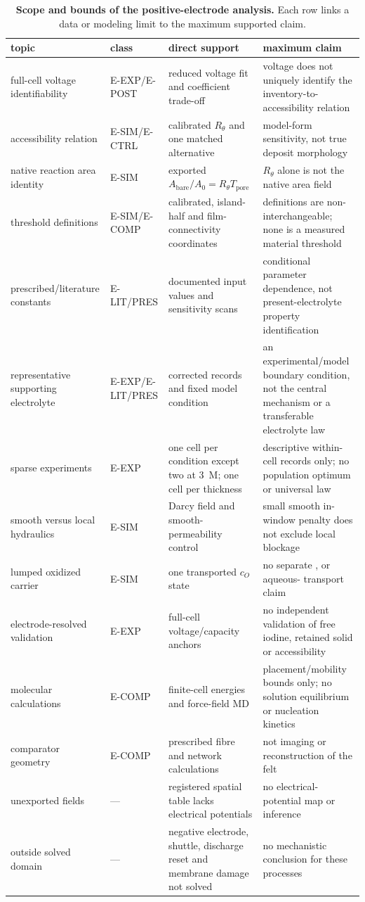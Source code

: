 \documentclass[11pt]{article}
\newcommand{\Rtheta}{R_{\theta}}
\newcommand{\Tpore}{T_{\mathrm{pore}}}
\begin{document}
\begin{table}[!htbp]
\centering\scriptsize
\caption{\textbf{Scope and bounds of the positive-electrode analysis.} Each row links a data or modeling limit
to the maximum supported claim.}
\label{tab:bounds}
\begin{tabularx}{\textwidth}{@{}P{2.7cm}P{2.0cm}YP{3.4cm}@{}}
\toprule
topic & class & direct support & maximum claim\\
\midrule
full-cell voltage identifiability & E-EXP/E-POST & reduced voltage fit and coefficient trade-off & voltage does not uniquely identify the inventory-to-accessibility relation\\
accessibility relation & E-SIM/E-CTRL & calibrated $\Rtheta$ and one matched alternative & model-form sensitivity, not true deposit morphology\\
native reaction area identity & E-SIM & exported $A_{\mathrm{bare}}/A_0=\Rtheta\Tpore$ & $\Rtheta$ alone is not the native area field\\
threshold definitions & E-SIM/E-COMP & calibrated, island-half and film-connectivity coordinates & definitions are non-interchangeable; none is a measured material threshold\\
prescribed/literature constants & E-LIT/PRES & documented input values and sensitivity scans & conditional parameter dependence, not present-electrolyte property identification\\
representative supporting electrolyte & E-EXP/E-LIT/PRES & corrected records and fixed model condition & an experimental/model boundary condition, not the central mechanism or a transferable electrolyte law\\
sparse experiments & E-EXP & one cell per condition except two at 3~M; one cell per thickness & descriptive within-cell records only; no population optimum or universal law\\
smooth versus local hydraulics & E-SIM & Darcy field and smooth-permeability control & small smooth in-window penalty does not exclude local blockage\\
lumped oxidized carrier & E-SIM & one transported $c_O$ state & no separate ,  or aqueous- transport claim\\
electrode-resolved validation & E-EXP & full-cell voltage/capacity anchors & no independent validation of free iodine, retained solid or accessibility\\
molecular calculations & E-COMP & finite-cell energies and force-field MD & placement/mobility bounds only; no solution equilibrium or nucleation kinetics\\
comparator geometry & E-COMP & prescribed fibre and network calculations & not imaging or reconstruction of the felt\\
unexported fields & --- & registered spatial table lacks electrical potentials & no electrical-potential map or inference\\
outside solved domain & --- & negative electrode, shuttle, discharge reset and membrane damage not solved & no mechanistic conclusion for these processes\\
\bottomrule
\end{tabularx}
\end{table}
\end{document}
